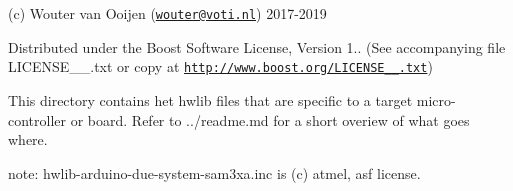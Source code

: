 (c) Wouter van Ooijen (\href{mailto:wouter@voti.nl}{\tt wouter@voti.\+nl}) 2017-\/2019

Distributed under the Boost Software License, Version 1.. (See accompanying file L\+I\+C\+E\+N\+S\+E\+\_\+\_.\+txt or copy at \href{http://www.boost.org/LICENSE_1_0.txt}{\tt http\+://www.\+boost.\+org/\+L\+I\+C\+E\+N\+S\+E\+\_\+\_.\+txt})

This directory contains het hwlib files that are specific to a target micro-\/controller or board. Refer to ../readme.md for a short overiew of what goes where.

note\+: hwlib-\/arduino-\/due-\/system-\/sam3xa.\+inc is (c) atmel, asf license. 